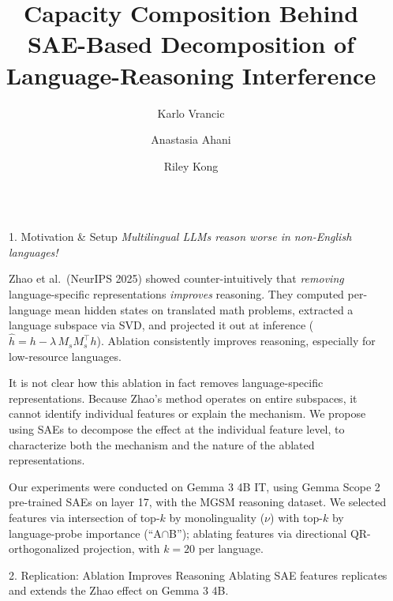 \documentclass[final,20pt]{beamer}
\title{Capacity Composition Behind SAE-Based Decomposition of Language-Reasoning Interference}
\author{Karlo Vrancic \and Anastasia Ahani \and Riley Kong}
\institute{MIT 6.8610 --- Quantitative Methods for Natural Language Processing --- Spring 2026}
\newlength{\sepwidth}
\newlength{\colwidth}
\newcommand{\separatorcolumn}{\begin{column}{\sepwidth}\end{column}}
\begin{document}
\begin{frame}[t]
\begin{columns}[t]
\separatorcolumn

\begin{column}{\colwidth}

  \begin{block}{1. Motivation \& Setup}
    \textit{Multilingual LLMs reason worse in non-English languages!}
    
    Zhao et al.\ (NeurIPS 2025) showed counter-intuitively that
    \emph{removing} language-specific representations \emph{improves}
    reasoning. They computed per-language mean hidden states on translated math
    problems, extracted a language subspace via SVD, and projected it out at
    inference ($\hat{h} = h - \lambda\, M_s M_s^\top h$). Ablation consistently improves reasoning, especially for low-resource languages.


    It is not clear how this ablation in fact removes language-specific representations.
    Because Zhao's method operates on entire subspaces, it cannot identify individual
    features or explain the mechanism. We propose using SAEs to decompose the effect at the individual feature level, to characterize both the mechanism and the nature of 
    the ablated representations.

    Our experiments were conducted on Gemma 3 4B IT, using Gemma Scope 2 pre-trained SAEs on layer 17, with the MGSM reasoning dataset.
    We selected features via intersection of top-$k$ by monolinguality ($\nu$) with top-$k$ by language-probe importance (``A$\cap$B''); ablating features via directional QR-orthogonalized projection, with $k{=}20$ per language. %

  \end{block}

  \begin{block}{2. Replication: Ablation Improves Reasoning}
    Ablating SAE features replicates and extends the Zhao effect on Gemma 3 4B.


\end{block}
\end{column}
\end{columns}
\end{frame}
\end{document}
